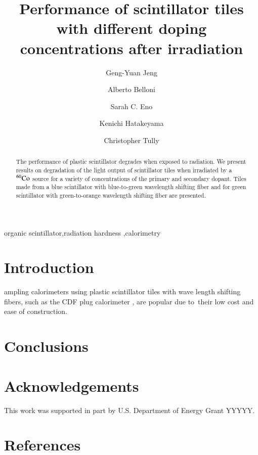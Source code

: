 \documentclass[review]{elsarticle}
\begin{document}
\begin{frontmatter}

\title{Performance of scintillator tiles with different doping concentrations after irradiation }


\author[umd]{Geng-Yuan Jeng}
\author[umd]{Alberto Belloni}
\author[umd]{Sarah C. Eno}
\author[baylor]{Kenichi Hatakeyama}
\author[princeton]{Christopher Tully}



\address[umd]{Dept. Physics, U. Maryland, College Park MD 30742 USA}
\address[eljen]{Eljen Technology, 1300 W. Broadway, Sweetwater, Tx 79556 USA}
\address[fnal]{Fermi National Accelerator Laboratory, Batavia, IL, USA}
\address[baylor]{Baylor University, Waco, Texas, USA}
\address[princeton]{Princeton University, Princeton, NJ, USA}

\begin{abstract}
The performance of plastic scintillator degrades when exposed to radiation. We present results on degradation of the light output of scintillator
tiles when irradiated by a $\rm{^{60}Co}$ source for a variety of concentrations of the primary and secondary dopant.  Tiles made from a blue scintillator with blue-to-green wavelength shifting fiber and for green scintillator with green-to-orange wavelength shifting fiber are presented.
\end{abstract}

\begin{keyword}
organic scintillator\sep radiation hardness \sep calorimetry
\end{keyword}

\end{frontmatter}

\linenumbers

\section{Introduction}
ampling calorimeters using plastic scintillator tiles with wave length shifting fibers, such as the CDF plug calorimeter \cite{Albrow20022524}, are popular due to\
 their low cost and ease of construction. 

\section{Conclusions}

\section{Acknowledgements}

This work was supported in part by U.S. Department of Energy Grant YYYYY.

\section*{References}


\end{document}

